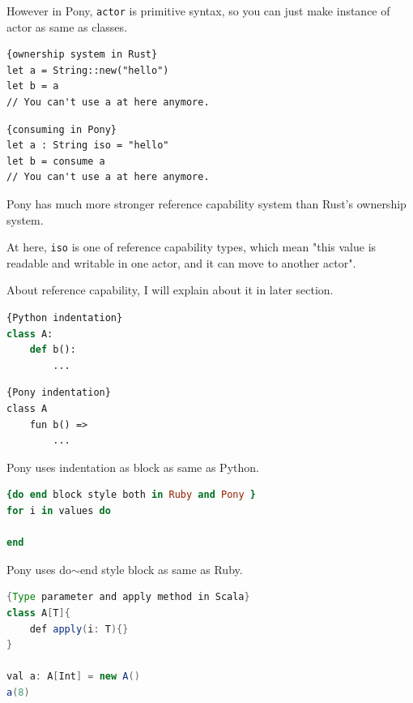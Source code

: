\documentclass{article}
\begin{document}
\begin{multicols}{2}
However in Pony, \texttt{actor} is primitive syntax, so you can just make instance of actor as same as classes. \\





\begin{lstlisting}{ownership system in Rust}
let a = String::new("hello")
let b = a
// You can't use a at here anymore.
\end{lstlisting}

\begin{lstlisting}{consuming in Pony}
let a : String iso = "hello"
let b = consume a
// You can't use a at here anymore.
\end{lstlisting}

Pony has much more stronger reference capability system than Rust's ownership system. 

At here, \texttt{iso} is one of reference capability types, which mean "this value is readable and writable in one actor, and it can move to another actor".

About reference capability, I will explain about it in later section.
\\



\begin{lstlisting}[language=Python]{Python indentation}
class A:
	def b():
		...
\end{lstlisting}

\begin{lstlisting}{Pony indentation}
class A
	fun b() =>
		...
\end{lstlisting}


Pony uses indentation as block as same as Python.\\

\begin{lstlisting}[language=Ruby]{do end block style both in Ruby and Pony }
for i in values do
	
end		
\end{lstlisting}

 Pony uses do$\sim$end style block as same as Ruby. \\


\begin{lstlisting}[language=Java]{Type parameter and apply method in Scala}
class A[T]{
	def apply(i: T){}
}	

val a: A[Int] = new A()
a(8)
\end{lstlisting}


\end{multicols}
\end{document}
